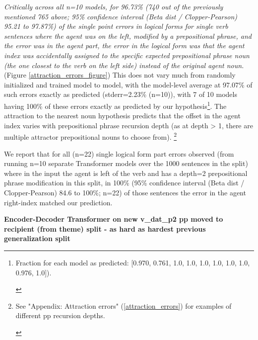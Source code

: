 \documentclass[11pt]{article}
\begin{document}
\textit{Critically across all n=10 \cite{Wu2023} models, for 96.73\% (740 out of the previously mentioned 765 above; 95\% confidence interval (Beta dist / Clopper-Pearson) 95.21 to 97.87\%) of the single point errors in logical forms for single verb sentences where the agent was on the left, modified by a prepositional phrase, and the error was in the agent part, the error in the logical form was that the agent index was accidentally assigned to the specific expected prepositional phrase noun (the one closest to the verb on the left side) instead of the original agent noun.} (Figure \ref{attraction_errors_figure})
This does not vary much from randomly initialized and trained model to model, with the model-level average at 97.07\% of such errors exactly as predicted (stderr=2.23\% (n=10)), with 7 of 10 models having 100\% of these errors exactly as predicted by our hypothesis\footnote{\begin{footnotesize}Fraction for each model as predicted: [0.970, 0.761, 1.0, 
1.0, 1.0, 1.0, 1.0, 1.0, 0.976, 1.0]).
\end{footnotesize}
}.
The attraction to the nearest noun hypothesis predicts that the offset in the agent index varies with prepositional phrase recursion depth (as at depth > 1, there are multiple attractor prepositional nouns to choose from).
\footnote{\begin{footnotesize}See "Appendix: Attraction errors" (\ref{attraction_errors}) for examples of different pp recursion depths.
\end{footnotesize}
}

We report that for all (n=22) single logical form part errors observed (from running n=10 separate Transformer models over the 1000 sentences in the split) where in the input the agent is left of the verb and has a depth=2 prepositional phrase modification in this split, in 100\% (95\% confidence interval (Beta dist / Clopper-Pearson) 84.6 to 100\%; n=22) of those sentences the error in the agent right-index matched our prediction.\label{error_analysis_for_baseline_transformer_predict_and_confirm_attraction_errors}

\textbf{\cite{Wu2023} Encoder-Decoder Transformer on new v\_dat\_p2 pp moved to recipient (from theme) split - as hard as hardest previous generalization split}
\end{document}

